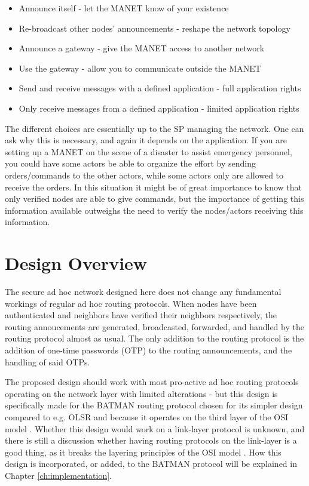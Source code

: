 \begin{itemize}
  \item Announce itself - let the \ac{MANET} know of your existence
  \item Re-broadcast other nodes' announcements - reshape the network topology
  \item Announce a gateway - give the \ac{MANET} access to another network
  \item Use the gateway - allow you to communicate outside the \ac{MANET}
  \item Send and receive messages with a defined application - full application
  rights
  \item Only receive messages from a defined application - limited application
  rights
\end{itemize}

The different choices are essentially up to the \ac{SP} managing the network.
One can ask why this is necessary, and again it depends on the application. If
you are setting up a \ac{MANET} on the scene of a disaster to assist emergency
personnel, you could have some actors be able to organize the effort by sending
orders/commands to the other actors, while some actors only are allowed to
receive the orders. In this situation it might be of great importance to know
that only verified nodes are able to give commands, but the importance of
getting this information available outweighs the need to verify the nodes/actors
receiving this information.


\section{Design Overview}
The secure ad hoc network designed here does not change any fundamental workings
of regular ad hoc routing protocols. When nodes have been authenticated and
neighbors have verified their neighbors respectively, the routing annoucements
are generated, broadcasted, forwarded, and handled by the routing protocol
almost as usual. The only addition to the routing protocol is the addition of
one-time passwords (OTP) to the routing announcements, and the handling of said
\acp{OTP}.

The proposed design should work with most pro-active ad hoc routing protocols
operating on the network layer with limited alterations - but this design is
specifically made for the BATMAN \cite{batman_rfc} routing protocol chosen for
its simpler design compared to e.g. OLSR \cite{clausen2003rfc3626} and because
it operates on the third layer of the \ac{OSI} model \cite{zimmermann1980osi}.
Whether this design would work on a link-layer protocol is unknown, and there is
still a discussion whether having routing protocols on the link-layer is a good
thing, as it breaks the layering principles of the \ac{OSI} model
\cite{5680190}. How this design is incorporated, or added, to the BATMAN
protocol will be explained in Chapter \ref{ch:implementation}.

